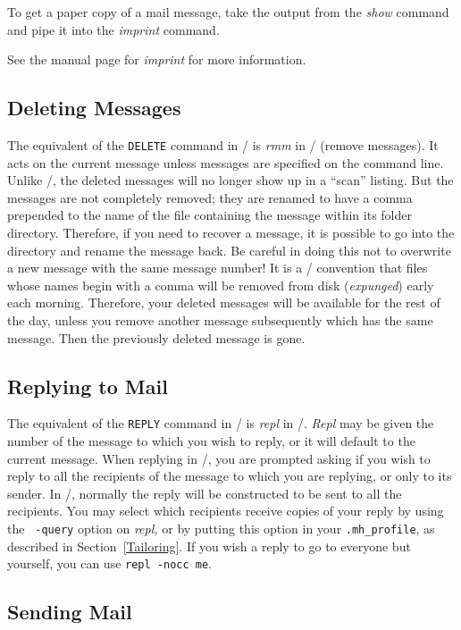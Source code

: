 To get a paper copy of a mail message, take the output from the {\it show\/}
command and pipe it into the {\it imprint\/} command.


See the manual page for {\it imprint\/} for more information.


\subsection{Deleting Messages}

The equivalent of the {\tt DELETE} command in \MM/ is {\it rmm\/} in \MH/
(remove messages).  It acts on the current message unless messages are
specified on the command line. Unlike \MM/, the deleted messages will
no longer show up in a ``scan'' listing. But the messages are not 
completely removed; they are renamed to have a comma
prepended to the name of the file containing the message within its folder
directory.  Therefore, if you need to recover a message, it is possible to
go into the directory and rename the message back.  Be careful in doing this
not to overwrite a new message with the same message number!  It is a \unix/
convention that files whose names begin with a comma will be removed from
disk ({\em expunged\/}) early each morning. Therefore, your deleted
messages will be available for the rest of the day, unless you remove another
message subsequently which has the same message.  Then the previously deleted
message is gone.

\subsection{Replying to Mail}

The equivalent of the {\tt REPLY} command in \MM/ is {\it repl\/} in \MH/.
{\it Repl\/} may be given the number of the message to which you wish to
reply, or it will default to the current message.  When replying in \MM/,
you are prompted asking if you wish to reply to all the recipients of the
message to which you are replying, or only to its sender.  In \MH/, normally
the reply will be constructed to be sent to all the recipients.  You may
select which recipients receive copies of your reply by using the {\tt
-query} option on {\it repl,} or by putting this option in your
\verb|.mh_profile|, as described in Section~\ref{Tailoring}. If you
wish a reply to go to everyone but yourself, you can 
use \verb|repl -nocc me|.

\subsection{Sending Mail}

